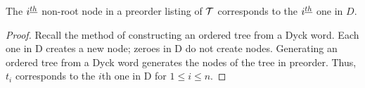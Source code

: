 \begin{remark}
    The $i^{\underline{th}}$ non-root node in a preorder listing of $\mathcal{T}$ corresponds to the $i^{\underline{th}}$ one in $D$.

\end{remark}
\begin{proof}
    Recall the method of constructing an ordered tree from a Dyck word.  Each one in D creates a new node; zeroes in D do not create nodes.  Generating an ordered tree from a Dyck word generates the nodes of the tree in preorder.  Thus, $t_i$ corresponds to the $i$th one in D for $1 \le i \le n$.
\end{proof}

